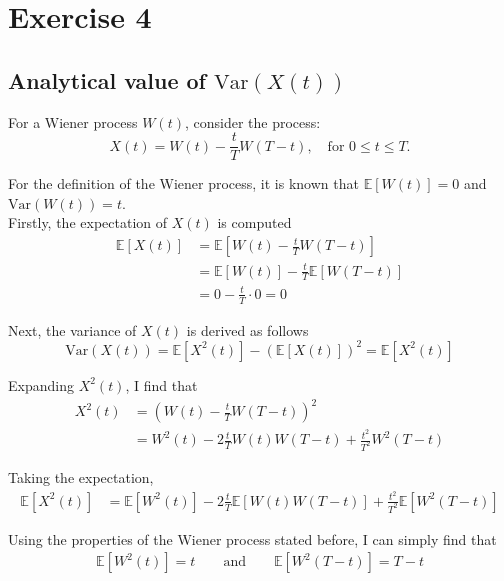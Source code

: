 \section{Exercise 4}

\subsection{Analytical value of $\text{Var}(X(t))$}

For a Wiener process $W(t)$, consider the process:
\begin{equation*}
X(t) = W(t) - \frac{t}{T}W(T-t), \quad \text{for } 0 \leq t \leq T.
\end{equation*}

For the definition of the Wiener process, it is known that $\mathbb{E}[W(t)]=0$ and $\text{Var}(W(t))=t$. \\

Firstly, the expectation of $X(t)$ is computed
\begin{align*}
\mathbb{E}[X(t)] &= \mathbb{E}\left[W(t) - \frac{t}{T}W(T-t)\right] \\
&= \mathbb{E}[W(t)] - \frac{t}{T}\mathbb{E}[W(T-t)] \\
&= 0 - \frac{t}{T} \cdot 0 = 0
\end{align*}

Next, the variance of $X(t)$ is derived as follows
\begin{equation*}
\text{Var}(X(t)) = \mathbb{E}[X^2(t)] - (\mathbb{E}[X(t)])^2 = \mathbb{E}[X^2(t)]
\end{equation*}

Expanding $X^2(t)$, I find that
\begin{align*}
X^2(t) &= \left(W(t) - \frac{t}{T}W(T-t)\right)^2 \\
&= W^2(t) - 2\frac{t}{T}W(t)W(T-t) + \frac{t^2}{T^2}W^2(T-t)
\end{align*}

Taking the expectation,
\begin{align}
\mathbb{E}[X^2(t)] &= \mathbb{E}[W^2(t)] - 2\frac{t}{T}\mathbb{E}[W(t)W(T-t)] +
                      \frac{t^2}{T^2}\mathbb{E}[W^2(T-t)] \label{eq:expX2}
\end{align}

Using the properties of the Wiener process stated before, I can simply find that
\begin{align}
\mathbb{E}[W^2(t)] = t \qquad \text{and} \qquad \mathbb{E}[W^2(T-t)] = T-t \label{eq:expvarW}
\end{align}


